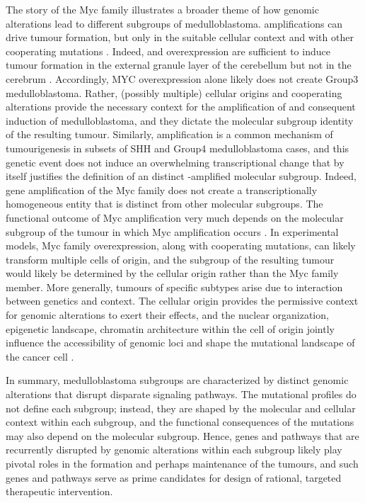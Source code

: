 The story of the Myc family illustrates a broader theme of how genomic alterations lead to different subgroups of medulloblastoma.  amplifications can drive tumour formation, but only in the suitable cellular context and with other cooperating mutations . Indeed,  and  overexpression are sufficient to induce tumour formation in the external granule layer of the cerebellum but not in the cerebrum . Accordingly, MYC overexpression alone likely does not create Group3 medulloblastoma. Rather, (possibly multiple) cellular origins and cooperating alterations provide the necessary context for the amplification of  and consequent induction of medulloblastoma, and they dictate the molecular subgroup identity of the resulting tumour. Similarly,  amplification is a common mechanism of tumourigenesis in subsets of SHH and Group4 medulloblastoma cases, and this genetic event does not induce an overwhelming transcriptional change that by itself justifies the definition of an distinct -amplified molecular subgroup. Indeed, gene amplification of the Myc family does not create a transcriptionally homogeneous entity that is distinct from other molecular subgroups. The functional outcome of Myc amplification very much depends on the molecular subgroup of the tumour in which Myc amplification occurs . In experimental models, Myc family overexpression, along with cooperating mutations, can likely transform multiple cells of origin, and the subgroup of the resulting tumour would likely be determined by the cellular origin rather than the Myc family member. More generally, tumours of specific subtypes arise due to interaction between genetics and context. The cellular origin provides the permissive context for genomic alterations to exert their effects, and the nuclear organization, epigenetic landscape, chromatin architecture within the cell of origin jointly influence the accessibility of genomic loci and shape the mutational landscape of the cancer cell .

In summary, medulloblastoma subgroups are characterized by distinct genomic alterations that disrupt disparate signaling pathways. The mutational profiles do not define each subgroup; instead, they are shaped by the molecular and cellular context within each subgroup, and the functional consequences of the mutations may also depend on the molecular subgroup. Hence, genes and pathways that are recurrently disrupted by genomic alterations within each subgroup likely play pivotal roles in the formation and perhaps maintenance of the tumours, and such genes and pathways serve as prime candidates for design of rational, targeted therapeutic intervention.

